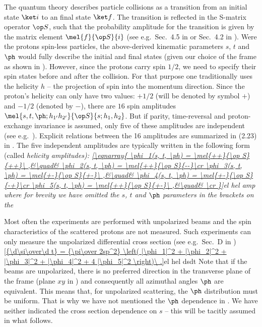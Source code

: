 The quantum theory describes particle collisions as a transition from an initial state $\ket i$ to an final state $\ket f$. The transition is reflected in the S-matrix operator $\op S$, such that the probability amplitude for the transition is given by the matrix element $\mel{f}{\op S}{i}$ (see e.g.~Sec.~4.5 in  or Sec.~4.2 in ). Were the protons spin-less particles, the above-derived kinematic parameters $s$, $t$ and $\ph$ would fully describe the initial and final states (given our choice of the  frame as shown in ). However, since the protons carry spin $1/2$, we need to specify their spin states before and after the collision. For that purpose one traditionally uses the helicity $h$ -- the projection of spin into the momentum direction. Since the proton's helicity can only have two values: $+1/2$ (will be denoted by symbol $+$) and $-1/2$ (denoted by $-$), there are $16$ spin amplitudes $\mel{s, t, \ph; h_{1'} h_{2'}}{\op S}{s; h_1, h_2}$. But if parity, time-reversal and proton-exchange invariance is assumed, only five of these amplitudes are independent (see e.g.~). Explicit relations between the 16 amplitudes are summarized in (2.23) in . The five independent amplitudes are typically written in the following form (called \em{helicity amplitudes}):
\eqref{\eqnarray{
\phi_1(s, t, \ph) = \mel{++}{\op S}{++}\ ,&\quad& \phi_2(s, t, \ph) = \mel{++}{\op S}{--}\cr
\phi_3(s, t, \ph) = \mel{+-}{\op S}{+-}\ ,&\quad& \phi_4(s, t, \ph) = \mel{+-}{\op S}{-+}\cr
\phi_5(s, t, \ph) = \mel{++}{\op S}{+-}\ ,&\quad& \cr
}}{el hel amp}
where for brevity we have omitted the $s$, $t$ and $\ph$ parameters in the brackets on the \rhs

Most often the experiments are performed with unpolarized beams and the spin characteristics of the scattered protons are not measured. Such experiments can only measure the unpolarized differential cross section (see e.g.~Sec.~D in )
\eqref{{\d\si\over\d t} = {\pi\over 2sp^2} \left( |\phi_1|^2 + |\phi_2|^2 + |\phi_3|^2 + |\phi_4|^2 + 4 |\phi_5|^2 \right)\ .}{el hel dsdt}
Note that if the beams are unpolarized, there is no preferred direction in the transverse plane of the  frame (plane $xy$ in ) and consequently all azimuthal angles $\ph$ are equivalent. This means that, for unpolarized scattering, the $\ph$ distribution must be uniform. That is why we have not mentioned the $\ph$ dependence in . We have neither indicated the cross section dependence on $s$ -- this will be tacitly assumed in what follows.

